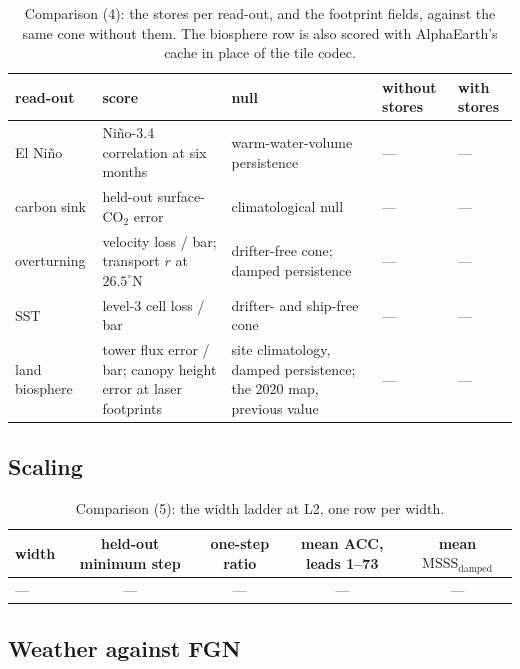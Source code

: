 \documentclass[10pt]{article}
\newcommand{\tbd}{\textcolor{ink2}{---}}
\begin{document}
\begin{table}[H]
\centering\footnotesize
\begin{tabular}{@{}L{2.6cm}L{4.4cm}L{3.6cm}L{1.8cm}L{1.6cm}@{}}
\toprule
read-out & score & null & without stores & with stores \\
\midrule
El Ni\~no & Ni\~no-3.4 correlation at six months & warm-water-volume persistence & \tbd & \tbd \\
carbon sink & held-out surface-CO$_2$ error & climatological null & \tbd & \tbd \\
overturning & velocity loss / bar; transport $r$ at $26.5^\circ$N & drifter-free cone; damped persistence & \tbd & \tbd \\
SST & level-3 cell loss / bar & drifter- and ship-free cone & \tbd & \tbd \\
land biosphere & tower flux error / bar; canopy height error at laser footprints & site climatology, damped persistence; the 2020 map, previous value & \tbd & \tbd \\
\bottomrule
\end{tabular}
\caption{Comparison (4): the stores per read-out, and the footprint fields,
against the same cone without them. The biosphere row is also scored with
AlphaEarth's cache in place of the tile codec.\label{tab:res-readouts}}
\end{table}

\subsection{Scaling}

\begin{table}[H]
\centering\footnotesize
\begin{tabular}{@{}lcccc@{}}
\toprule
width & held-out minimum step & one-step ratio & mean ACC, leads 1--73 & mean $\mathrm{MSSS}_{\text{damped}}$ \\
\midrule
\tbd & \tbd & \tbd & \tbd & \tbd \\
\bottomrule
\end{tabular}
\caption{Comparison (5): the width ladder at L2, one row per
width.\label{tab:res-width}}
\end{table}

\subsection{Weather against FGN}
\end{document}
